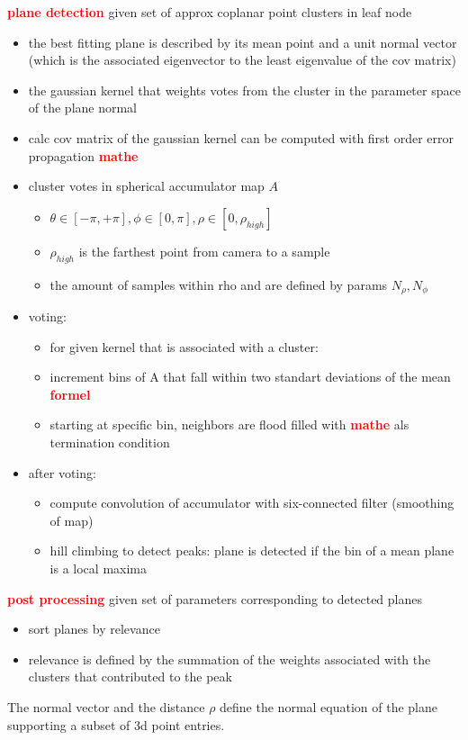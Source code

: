 \documentclass[main.tex]{subfiles}
\begin{document}
\textbf{\textcolor{red}{plane detection}}
given set of approx coplanar point clusters in leaf node
\begin{itemize}
    \item the best fitting plane is described by its mean point and a unit normal vector (which is the 
    associated eigenvector to the least eigenvalue of the cov matrix)
    \item the gaussian kernel that weights votes from the cluster in the parameter space of the plane normal
    \item calc cov matrix of the gaussian kernel can be computed with first order error propagation \textbf{\textcolor{red}{mathe}}
    \item cluster votes in spherical accumulator map $A$
    \begin{itemize}
        \item $\theta \in [-\pi , +\pi], \phi \in [0, \pi], \rho \in [0, \rho_{high}]$
        \item $\rho_{high}$ is the farthest point from camera to a sample
        \item the amount of samples within rho and are defined by params $N_\rho, N_\phi$
    \end{itemize}
    \item voting:
    \begin{itemize}
        \item for given kernel that is associated with a cluster:
        \item increment bins of A that fall within two standart deviations of the mean \textbf{\textcolor{red}{formel}}
        \item starting at specific bin, neighbors are flood filled with \textbf{\textcolor{red}{mathe}} als termination condition
    \end{itemize}
    \item after voting:
    \begin{itemize}
        \item compute convolution of accumulator with six-connected filter (smoothing of map)
        \item hill climbing to detect peaks: plane is detected if the bin of a mean plane is a local maxima
    \end{itemize}
\end{itemize}

\textbf{\textcolor{red}{post processing}}
given set of parameters corresponding to detected planes
\begin{itemize}
    \item sort planes by relevance
    \item relevance is defined by the summation of the weights associated with the clusters that contributed to the peak
\end{itemize}
The normal vector and the distance $\rho$ define the normal equation of the plane supporting a subset of 
3d point entries.
\end{document}
